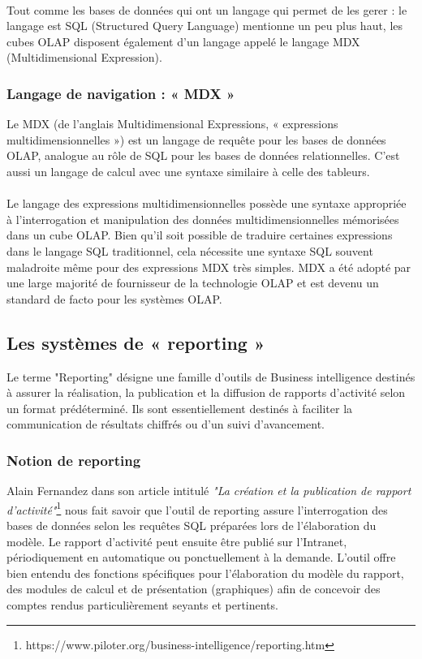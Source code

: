 \paragraph{}
Tout comme les bases de données qui ont un langage qui permet de les gerer : le langage est SQL (Structured Query Language) mentionne un peu plus haut, les cubes OLAP disposent également d’un langage appelé le langage MDX (Multidimensional Expression).


\subsubsection{Langage de navigation : « MDX »}
Le MDX (de l'anglais Multidimensional Expressions, « expressions multidimensionnelles ») est un langage de requête pour les bases de données OLAP, analogue au rôle de SQL pour les bases de données relationnelles. C'est aussi un langage de calcul avec une syntaxe similaire à celle des tableurs.
\paragraph{}
Le langage des expressions multidimensionnelles possède une syntaxe appropriée à l'interrogation et manipulation des données multidimensionnelles mémorisées dans un cube OLAP. Bien qu'il soit possible de traduire certaines expressions dans le langage SQL traditionnel, cela nécessite une syntaxe SQL souvent maladroite même pour des expressions MDX très simples. MDX a été adopté par une large majorité de fournisseur de la technologie OLAP et est devenu un standard de facto pour les systèmes OLAP.


\subsection{Les systèmes de « reporting »}
Le terme "Reporting" désigne une famille d'outils de Business intelligence destinés à assurer la réalisation, la publication et la diffusion de rapports d'activité selon un format prédéterminé. Ils sont essentiellement destinés à faciliter la communication de résultats chiffrés ou d'un suivi d'avancement.

\subsubsection{Notion de reporting}
Alain Fernandez dans son article intitulé \textit{"La création et la publication de rapport d'activité"}\footnote{https://www.piloter.org/business-intelligence/reporting.htm} nous fait savoir que l'outil de reporting assure l'interrogation des bases de données selon les requêtes SQL préparées lors de l'élaboration du modèle. Le rapport d'activité peut ensuite être publié sur l'Intranet, périodiquement en automatique ou ponctuellement à la demande. L'outil offre bien entendu des fonctions spécifiques pour l'élaboration du modèle du rapport, des modules de calcul et de présentation (graphiques) afin de concevoir des comptes rendus particulièrement seyants et pertinents.
